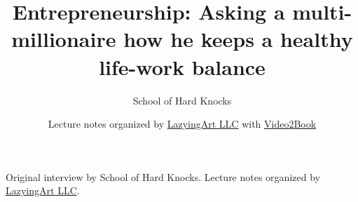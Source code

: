 \documentclass[11pt,oneside]{book}
\begin{document}
\frontmatter
\title{Entrepreneurship: Asking a multi-millionaire how he keeps a healthy life-work balance}
\author{School of Hard Knocks}
\date{Lecture notes organized by \href{https://lazying.art}{LazyingArt LLC} with \href{https://github.com/lachlanchen/Video2Book}{Video2Book}}
\maketitle
\begin{center}
\small Original interview by School of Hard Knocks. Lecture notes organized by \href{https://lazying.art}{LazyingArt LLC}.
\end{center}
\clearpage
\mainmatter

\end{document}
